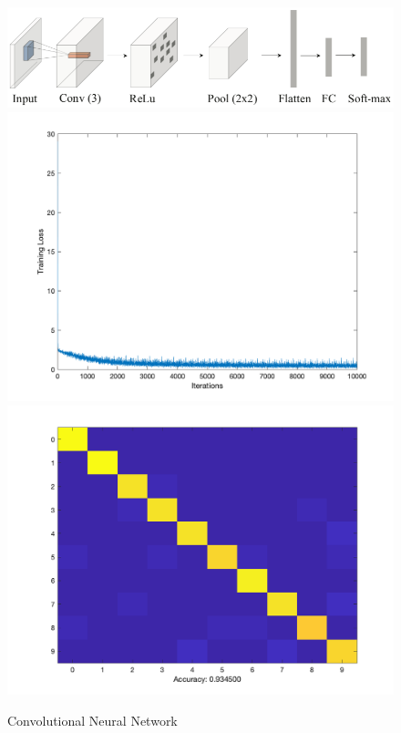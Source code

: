 \documentclass[letter, 10pt]{article}
\begin{document}
\begin{figure}[H]
        \centering
        \includegraphics[width=\textwidth]{HW4/RESULT/CNN.png}
    \endminipage\hfill
        \centering
        \includegraphics[width=1.1\textwidth]{HW4/RESULT/CNN_loss.png}
    \endminipage\hfill
        \centering
        \includegraphics[width=1.1\textwidth]{HW4/RESULT/CNN_CONFUSION.png}
    \endminipage\hfill
    \caption{Convolutional Neural Network}
\end{figure}
\end{document}
